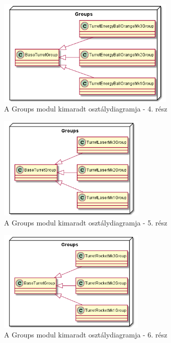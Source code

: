 \begin{figure}[h!]
	\centering
	\includegraphics[width=0.76\textwidth]{kepek/uml/groups/group-pt5.png}
	\caption{A Groups modul kimaradt osztálydiagramja - 4. rész}
	\label{fig:uml:group-pt5}
\end{figure}

\begin{figure}[h!]
	\centering
	\includegraphics[width=0.63\textwidth]{kepek/uml/groups/group-pt6.png}
	\caption{A Groups modul kimaradt osztálydiagramja - 5. rész}
	\label{fig:uml:group-pt6}
\end{figure}

\begin{figure}[h!]
	\centering
	\includegraphics[width=0.628\textwidth]{kepek/uml/groups/group-pt7.png}
	\caption{A Groups modul kimaradt osztálydiagramja - 6. rész}
	\label{fig:uml:group-pt7}
\end{figure}



